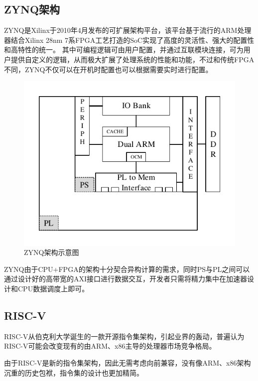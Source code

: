     \subsection{ZYNQ架构}
    ZYNQ是Xilinx于2010年4月发布的可扩展架构平台，该平台基于流行的ARM处理器结合Xilinx 28nm 7系FPGA工艺打造的SoC实现了高度的灵活性、强大的配置性和高特性的统一。
    其中可编程逻辑可由用户配置，并通过互联模块连接，可为用户提供自定义的逻辑，从而极大扩展了处理系统的性能和功能，不过和传统FPGA不同，ZYNQ不仅可以在开机时配置也可以根据需要实时进行配置。
    \begin{figure}[h]
        \label{zynq}
        \centering
        \includegraphics{../pdf/zynq.pdf}
        \caption{ZYNQ架构示意图}
        \label{}
    \end{figure}
    ZYNQ由于CPU+FPGA的架构十分契合异构计算的需求，同时PS与PL之间可以通过设计好的高带宽的AXI接口进行数据交互，开发者只需将精力集中在加速器设计和CPU数据调度上即可。
    \subsection{RISC-V}
    RISC-V从伯克利大学诞生的一款开源指令集架构，引起业界的轰动，普遍认为RISC-V可能会改变现有的由ARM、x86主导的处理器市场竞争格局。

    由于RISC-V是新的指令集架构，因此无需考虑向前兼容，没有像ARM、x86架构沉重的历史包袱，指令集的设计也更加精简。

